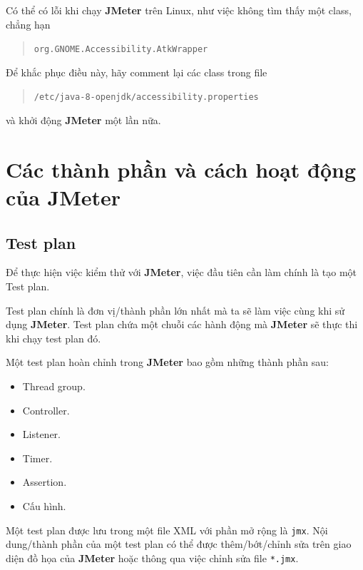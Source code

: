 \documentclass[10pt]{report}
\newcommand{\jmeter}{\textbf{JMeter}}
\begin{document}
\par Có thể có lỗi khi chạy \jmeter{} trên Linux, như việc không tìm thấy một class, chẳng hạn
\begin{quotation}
    \texttt{org.GNOME.Accessibility.AtkWrapper}
\end{quotation}

\par Để khắc phục điều này, hãy comment lại các class trong file
\begin{quotation}
    \texttt{/etc/java-8-openjdk/accessibility.properties}
\end{quotation}
\par và khởi động \jmeter{} một lần nữa.

\chapter{Các thành phần và cách hoạt động của JMeter}

\section{Test plan}

\par Để thực hiện việc kiểm thử với \jmeter{}, việc đầu tiên cần làm chính là tạo một Test plan.

\par Test plan chính là đơn vị/thành phần lớn nhất mà ta sẽ làm việc cùng khi sử dụng \jmeter{}. Test plan chứa một chuỗi các hành động mà \jmeter{} sẽ thực thi khi chạy test plan đó.

\par Một test plan hoàn chỉnh trong \jmeter{} bao gồm những thành phần sau:
\begin{itemize}[itemsep=0pt]
    \item Thread group.
    \item Controller.
    \item Listener.
    \item Timer.
    \item Assertion.
    \item Cấu hình.
\end{itemize}

\par Một test plan được lưu trong một file XML với phần mở rộng là \texttt{jmx}. Nội dung/thành phần của một test plan có thể được thêm/bớt/chỉnh sửa trên giao diện đồ họa của \jmeter{} hoặc thông qua việc chỉnh sửa file \texttt{*.jmx}.
\end{document}
